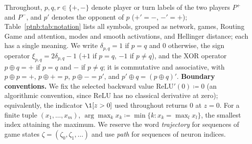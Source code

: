 Throughout, $p, q, r \in \{+, -\}$ denote player or turn labels of the two players $P^+$ and $P^-$,
and $p'$ denotes the opponent of $p$ ($+' = -$, $-' = +$); Table~\ref{ptnb:tab:notation} lists all
symbols, grouped as network, games, Routing Game and attention, modes and smooth activations, and
Hellinger distance; each has a single meaning. We write $\delta_{p,q} = 1$ if $p=q$ and $0$
otherwise, the sign operator $\xi_{p,q} = 2\delta_{p,q} - 1$ ($+1$ if $p=q$, $-1$ if $p \neq q$),
and the XOR operator $p \oplus q = +$ if $p=q$ and $-$ if $p \neq q$; it is commutative and
associative, with $p \oplus p = +$, $p \oplus + = p$, $p \oplus - = p'$, and $p' \oplus q = (p
    \oplus q)'$.
\textbf{Boundary conventions.} We fix the selected backward value $\mathrm{ReLU}'(0)\coloneqq0$ (an algorithmic convention, since ReLU has no classical derivative at zero); equivalently, the indicator
$\1[z > 0]$ used throughout returns $0$ at $z = 0$. For a finite tuple $(x_1, \dots, x_m)$,
$\arg\max_k x_k \coloneqq \min\{k : x_k = \max_l x_l\}$, the smallest index attaining the maximum.
We reserve the word \emph{trajectory} for sequences of game states $\zeta = (\zeta_0, \zeta_1,
    \dots)$ and use \emph{path} for sequences of neuron indices.


